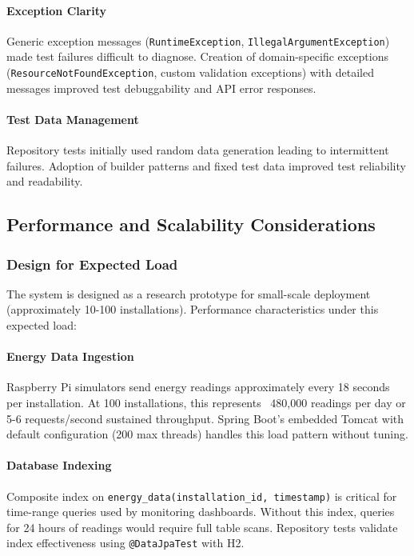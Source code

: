 \paragraph{Exception Clarity}
Generic exception messages (\texttt{RuntimeException}, \texttt{IllegalArgumentException}) made test failures difficult to diagnose. Creation of domain-specific exceptions (\texttt{ResourceNotFoundException}, custom validation exceptions) with detailed messages improved test debuggability and API error responses.

\paragraph{Test Data Management}
Repository tests initially used random data generation leading to intermittent failures. Adoption of builder patterns and fixed test data improved test reliability and readability.

\subsection{Performance and Scalability Considerations}
\label{subsec:scalability-analysis}

\subsubsection{Design for Expected Load}
\label{subsubsec:high-volume-ingestion}

The system is designed as a research prototype for small-scale deployment (approximately 10-100 installations). Performance characteristics under this expected load:

\paragraph{Energy Data Ingestion}
Raspberry Pi simulators send energy readings approximately every 18 seconds per installation. At 100 installations, this represents ~480,000 readings per day or 5-6 requests/second sustained throughput. Spring Boot's embedded Tomcat with default configuration (200 max threads) handles this load pattern without tuning.

\paragraph{Database Indexing}
Composite index on \texttt{energy\_data(installation\_id, timestamp)} is critical for time-range queries used by monitoring dashboards. Without this index, queries for 24 hours of readings would require full table scans. Repository tests validate index effectiveness using \texttt{@DataJpaTest} with H2.

